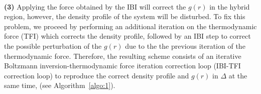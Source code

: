 \documentclass[aps,prb,preprint,citeautoscript]{revtex4}
\newcommand{\recheck}[1]{{\color{black} #1}}
\newcommand{\redc}[1]{{\color{black} #1}}
\renewcommand{\v}[1]{\textbf{\textit{#1}}}
\begin{document}
\\
{\bf (3)}  Applying the force obtained by the IBI will correct the $g(r)$ in the hybrid region, however,
the density profile of the system will be disturbed.
To fix this problem, we proceed by performing an additional iteration on the thermodynamic force (TFI) which corrects the density profile,
followed by an IBI step to correct the possible perturbation
of the $g(r)$ due to the the previous iteration of the thermodynamic force.
Therefore, the resulting scheme consists of an iterative
Boltzmann inversion-thermodynamic force iteration correction loop
(IBI-TFI correction loop) to reproduce the correct density
profile and $g(r)$ in $\Delta$ at the same time, (see Algorithm~\ref{algo:1}). 
\end{document}
